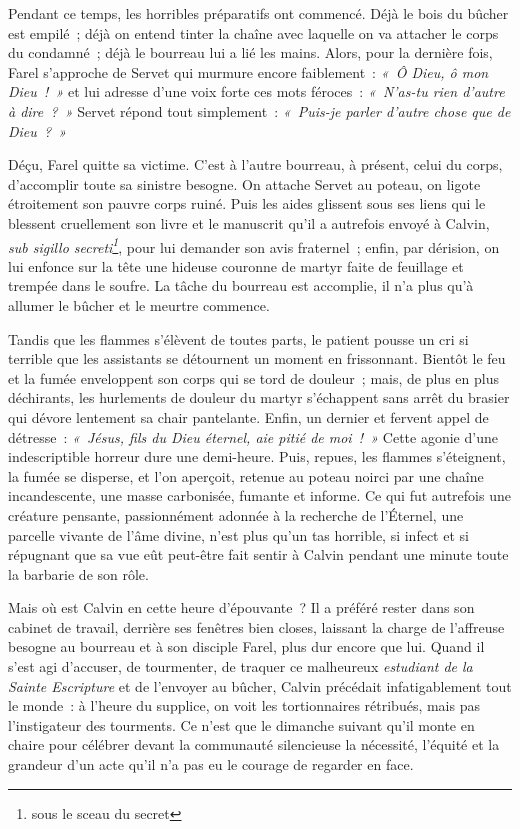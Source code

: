 \documentclass[french,twoside]{book} %
\newcommand\foreign[1]{\emph{#1}}
\newcommand\chapterclose{} %
\begin{document}
\noindent Pendant ce temps, les horribles préparatifs ont commencé. Déjà le bois du bûcher est empilé ; déjà on entend tinter la chaîne avec laquelle on va attacher le corps du condamné ; déjà le bourreau lui a lié les mains. Alors, pour la dernière fois, Farel s’approche de Servet qui murmure encore faiblement : \emph{« Ô Dieu, ô mon Dieu ! »} et lui adresse d’une voix forte ces mots féroces : \emph{« N’as-tu rien d’autre à dire ? »} Servet répond tout simplement : \emph{« Puis-je parler d’autre chose que de Dieu ? »}\par
Déçu, Farel quitte sa victime. C’est à l’autre bourreau, à présent, celui du corps, d’accomplir toute sa sinistre besogne. On attache Servet au poteau, on ligote étroitement son pauvre corps ruiné. Puis les aides glissent sous ses liens qui le blessent cruellement son livre et le manuscrit qu’il a autrefois envoyé à Calvin, \foreign{sub sigillo secreti\footnote{sous le sceau du secret}}, pour lui demander son avis fraternel ; enfin, par dérision, on lui enfonce sur la tête une hideuse couronne de martyr faite de feuillage et trempée dans le soufre. La tâche du bourreau est accomplie, il n’a plus qu’à allumer le bûcher et le meurtre commence.\par
Tandis que les flammes s’élèvent de toutes parts, le patient pousse un cri si terrible que les assistants se détournent un moment en frissonnant. Bientôt le feu et la fumée enveloppent son corps qui se tord de douleur ; mais, de plus en plus déchirants, les hurlements de douleur du martyr s’échappent sans arrêt du brasier qui dévore lentement sa chair pantelante. Enfin, un dernier et fervent appel de détresse : \emph{« Jésus, fils du Dieu éternel, aie pitié de moi ! »} Cette agonie d’une indescriptible horreur dure une demi-heure. Puis, repues, les flammes s’éteignent, la fumée se disperse, et l’on aperçoit, retenue au poteau noirci par une chaîne incandescente, une masse carbonisée, fumante et informe. Ce qui fut autrefois une créature pensante, passionnément adonnée à la recherche de l’Éternel, une parcelle vivante de l’âme divine, n’est plus qu’un tas horrible, si infect et si répugnant que sa vue eût peut-être fait sentir à Calvin pendant une minute toute la barbarie de son rôle.\par
Mais où est Calvin en cette heure d’épouvante ? Il a préféré rester dans son cabinet de travail, derrière ses fenêtres bien closes, laissant la charge de l’affreuse besogne au bourreau et à son disciple Farel, plus dur encore que lui. Quand il s’est agi d’accuser, de tourmenter, de traquer ce malheureux \emph{estudiant de la Sainte Escripture} et de l’envoyer au bûcher, Calvin précédait infatigablement tout le monde : à l’heure du supplice, on voit les tortionnaires rétribués, mais pas l’instigateur des tourments. Ce n’est que le dimanche suivant qu’il monte en chaire pour célébrer devant la communauté silencieuse la nécessité, l’équité et la grandeur d’un acte qu’il n’a pas eu le courage de regarder en face.
\chapterclose
\end{document}
